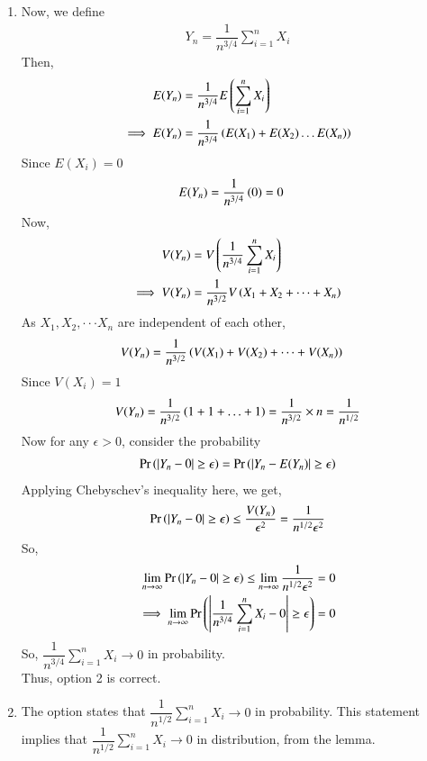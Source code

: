 \documentclass[journal,12pt,twocolumn]{IEEEtran}
\begin{document}
\begin{enumerate}
\item Now, we define
\begin{align}
    Y_n=\dfrac{1}{n^{3/4}}\sum_{i=1}^n X_i
\end{align}
Then,
\begin{align}
    E(Y_n) &= \dfrac{1}{n^{3/4}}E\left(\sum_{i=1}^n X_i\right) \\
    \implies E(Y_n) &= \dfrac{1}{n^{3/4}}\left(E(X_1)+E(X_2) \ldots E(X_n)\right)
\end{align}
Since $E(X_i) = 0$
\begin{align}
    E(Y_n) &= \dfrac{1}{n^{3/4}}\left(0\right) =0
\end{align}
Now,
\begin{align}
    V(Y_n) &= V\left(\dfrac{1}{n^{3/4}}\sum_{i=1}^n X_i\right) \\
    \implies V(Y_n) &= \dfrac{1}{n^{3/2}}V\left(X_1+X_2+ \dots +X_n\right)
\end{align}
As $X_1, X_2, \cdot \cdot \cdot X_n$ are independent of each other,
\begin{align}
    V(Y_n) &= \dfrac{1}{n^{3/2}}\left(V(X_1)+V(X_2)+ \dots +V(X_n)\right)
\end{align}
Since $V(X_i) = 1$
\begin{align}
    V(Y_n)=\dfrac{1}{n^{3/2}}\left(1+1+ \ldots +1\right)=\dfrac{1}{n^{3/2}}\times n=\dfrac{1}{n^{1/2}}
\end{align}
Now for any $\epsilon>0$, consider the probability
\begin{align}
    \Pr\left(|Y_n-0|\geq \epsilon\right)=\Pr\left(|Y_n-E(Y_n)|\geq \epsilon\right)
\end{align}
Applying Chebyschev's inequality here, we get,
\begin{align}
    \Pr\left(|Y_n-0|\geq \epsilon\right) \leq \dfrac{V(Y_n)}{\epsilon^2} = \dfrac{1}{n^{1/2}\epsilon^2}
\end{align}
So,
\begin{align}
    \lim_{n \to \infty}\Pr\left(|Y_n-0|\geq \epsilon\right) \leq \lim_{n \to \infty }\dfrac{1}{n^{1/2}\epsilon^2}=0\\
    \implies \lim_{n \to \infty}\Pr\left(\left | \dfrac{1}{n^{3/4}}\sum_{i=1}^n X_i - 0 \right|\geq \epsilon\right)=0
\end{align}
So, $\dfrac{1}{n^{3/4}}\sum_{i=1}^n X_i \to 0$ in probability.\\
Thus, option 2 is correct.

\item The option states that
\begin{math}
 \dfrac{1}{n^{1/2}} \sum_{i=1}^n X_i \to 0
\end{math} 
in probability. This statement implies that $\dfrac{1}{n^{1/2}} \sum_{i=1}^n X_i \to 0$ in distribution, from the lemma.


\end{enumerate}
\end{document}
